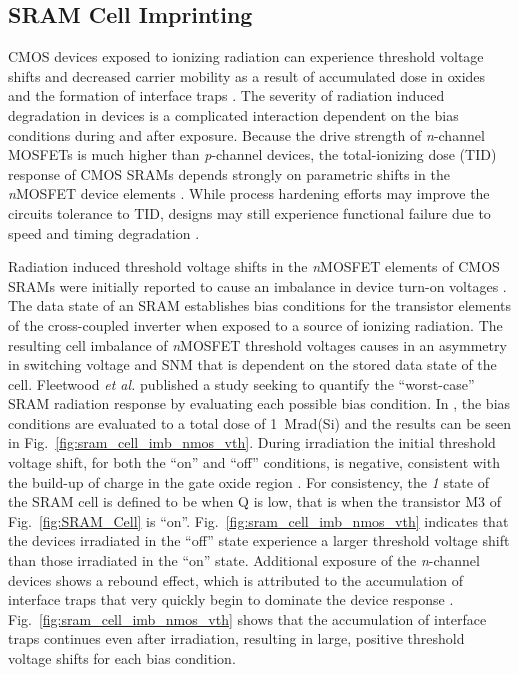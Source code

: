 \subsection{SRAM Cell Imprinting} %
\label{sub:sram_cell_imprinting}
CMOS devices exposed to ionizing radiation can experience threshold voltage shifts and decreased carrier mobility as a result of accumulated dose in oxides and the formation of interface traps \cite{Dressendorfer:1981kg, Galloway:1990kh, Fleetwood:1993vs, Fleetwood:1995tk}. 
The severity of radiation induced degradation in devices is a complicated interaction dependent on the bias conditions during and after exposure. 
Because the drive strength of \emph{n}-channel MOSFETs is much higher than \emph{p}-channel devices, the total-ionizing dose (TID) response of CMOS SRAMs depends strongly on parametric shifts in the \emph{n}MOSFET device elements \cite{Schott:1987cx,Fleetwood:1987cfa}. 
While process hardening efforts may improve the circuits tolerance to TID, designs may still experience functional failure due to speed and timing degradation \cite{Fleetwood:1987cfa,Felix:2006jl}.

Radiation induced threshold voltage shifts in the \emph{n}MOSFET elements of CMOS SRAMs were initially reported to cause an imbalance in device turn-on voltages \cite{Arimura:1985wl}.
The data state of an SRAM establishes bias conditions for the transistor elements of the cross-coupled inverter when exposed to a source of ionizing radiation. 
The resulting cell imbalance of \emph{n}MOSFET threshold voltages causes in an asymmetry in switching voltage and SNM that is dependent on the stored data state of the cell. 
Fleetwood \emph{et al.} published a study seeking to quantify the ``worst-case'' SRAM radiation response by evaluating each possible bias condition. 
In \cite{Fleetwood:1987cfa}, the bias conditions are evaluated to a total dose of 1~Mrad(Si) and the results can be seen in Fig.~\ref{fig:sram_cell_imb_nmos_vth}.
During irradiation the initial threshold voltage shift, for both the ``on'' and ``off'' conditions, is negative, consistent with the build-up of charge in the gate oxide region \cite{Dressendorfer:1981kg,Galloway:1990kh}. 
For consistency, the \emph{1} state of the SRAM cell is defined to be when Q is low, that is when the transistor M3 of Fig.~\ref{fig:SRAM_Cell} is ``on''.
Fig.~\ref{fig:sram_cell_imb_nmos_vth} indicates that the devices irradiated in the ``off'' state experience a larger threshold voltage shift than those irradiated in the ``on'' state.
Additional exposure of the \emph{n}-channel devices shows a rebound effect, which is attributed to the accumulation of interface traps that very quickly begin to dominate the device response \cite{Fleetwood:1993vs,Galloway:1990kh}. 
Fig.~\ref{fig:sram_cell_imb_nmos_vth} shows that the accumulation of interface traps continues even after irradiation, resulting in large, positive threshold voltage shifts for each bias condition.

